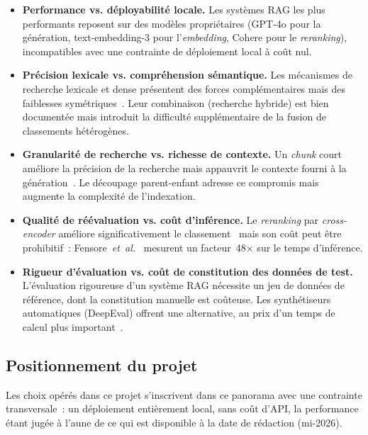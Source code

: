 \documentclass[11pt,a4paper]{article}
\begin{document}
\begin{itemize}
  \item \textbf{Performance vs. déployabilité locale.} Les systèmes RAG les plus performants reposent sur des modèles propriétaires (GPT-4o pour la génération, text-embedding-3 pour l'\textit{embedding}, Cohere pour le \textit{reranking}), incompatibles avec une contrainte de déploiement local à coût nul.

  \item \textbf{Précision lexicale vs. compréhension sémantique.} Les mécanismes de recherche lexicale et dense présentent des forces complémentaires mais des faiblesses symétriques~\cite{strich2026bm25}. Leur combinaison (recherche hybride) est bien documentée mais introduit la difficulté supplémentaire de la fusion de classements hétérogènes.

  \item \textbf{Granularité de recherche vs. richesse de contexte.} Un \textit{chunk} court améliore la précision de la recherche mais appauvrit le contexte fourni à la génération~\cite{lu2025hichunk}. Le découpage parent-enfant adresse ce compromis mais augmente la complexité de l'indexation.

  \item \textbf{Qualité de réévaluation vs. coût d'inférence.} Le \textit{reranking} par \textit{cross-encoder} améliore significativement le classement~\cite{nogueira2019bert} mais son coût peut être prohibitif~: Fensore~\textit{et~al.}~\cite{fensore2025liverag} mesurent un facteur~48$\times$ sur le temps d'inférence.

  \item \textbf{Rigueur d'évaluation vs. coût de constitution des données de test.} L'évaluation rigoureuse d'un système RAG nécessite un jeu de données de référence, dont la constitution manuelle est coûteuse. Les synthétiseurs automatiques (DeepEval) offrent une alternative, au prix d'un temps de calcul plus important~\cite{deepeval2024}.
\end{itemize}

\subsection*{Positionnement du projet}

Les choix opérés dans ce projet s'inscrivent dans ce panorama avec une contrainte transversale~: un déploiement entièrement local, sans coût d'API, la performance étant jugée à l'aune de ce qui est disponible à la date de rédaction (mi-2026).
\end{document}
